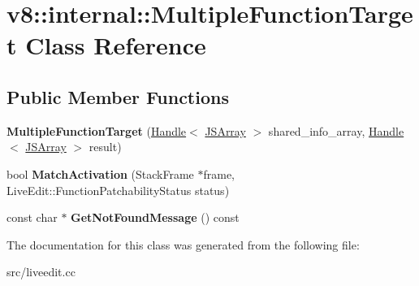 \hypertarget{classv8_1_1internal_1_1_multiple_function_target}{}\section{v8\+:\+:internal\+:\+:Multiple\+Function\+Target Class Reference}
\label{classv8_1_1internal_1_1_multiple_function_target}
\subsection*{Public Member Functions}
\begin{DoxyCompactItemize}
\item 
\hypertarget{classv8_1_1internal_1_1_multiple_function_target_abdaae069a64a597a72bd8820028182eb}{}{\bfseries Multiple\+Function\+Target} (\hyperlink{classv8_1_1internal_1_1_handle}{Handle}$<$ \hyperlink{classv8_1_1internal_1_1_j_s_array}{J\+S\+Array} $>$ shared\+\_\+info\+\_\+array, \hyperlink{classv8_1_1internal_1_1_handle}{Handle}$<$ \hyperlink{classv8_1_1internal_1_1_j_s_array}{J\+S\+Array} $>$ result)\label{classv8_1_1internal_1_1_multiple_function_target_abdaae069a64a597a72bd8820028182eb}

\item 
\hypertarget{classv8_1_1internal_1_1_multiple_function_target_a5a201cd0c25b89209238eb2504ce279c}{}bool {\bfseries Match\+Activation} (Stack\+Frame $\ast$frame, Live\+Edit\+::\+Function\+Patchability\+Status status)\label{classv8_1_1internal_1_1_multiple_function_target_a5a201cd0c25b89209238eb2504ce279c}

\item 
\hypertarget{classv8_1_1internal_1_1_multiple_function_target_aaba514129e81f040a01585274ba28338}{}const char $\ast$ {\bfseries Get\+Not\+Found\+Message} () const \label{classv8_1_1internal_1_1_multiple_function_target_aaba514129e81f040a01585274ba28338}

\end{DoxyCompactItemize}


The documentation for this class was generated from the following file\+:\begin{DoxyCompactItemize}
\item 
src/liveedit.\+cc\end{DoxyCompactItemize}
